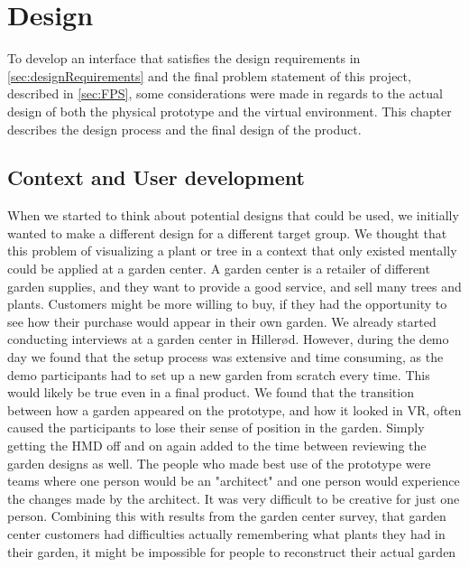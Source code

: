 \chapter{Design}
\label{chp:design}
To develop an interface that satisfies the design requirements in \autoref{sec:designRequirements} and the final problem statement of this project, described in \autoref{sec:FPS}, some considerations were made in regards to the actual design of both the physical prototype and the virtual environment. This chapter describes the design process and the final design of the product.

\section{Context and User development}
When we started to think about potential designs that could be used, we initially wanted to make a different design for a different target group. We thought that this problem of visualizing a plant or tree in a context that only existed mentally could be applied at a garden center. A garden center is a retailer of different garden supplies, and they want to provide a good service, and sell many trees and plants. Customers might be more willing to buy, if they had the opportunity to see how their purchase would appear in their own garden. We already started conducting interviews at a garden center in Hillerød. However, during the demo day we found that the setup process was extensive and time consuming, as the demo participants had to set up a new garden from scratch every time. This would likely be true even in a final product. We found that the transition between how a garden appeared on the prototype, and how it looked in VR, often caused the participants to lose their sense of position in the garden. Simply getting the HMD off and on again added to the time between reviewing the garden designs as well. The people who made best use of the prototype were teams where one person would be an "architect" and one person would experience the changes made by the architect. It was very difficult to be creative for just one person. Combining this with results from the garden center survey, that garden center customers had difficulties actually remembering what plants they had in their garden, it might be impossible for people to reconstruct their actual garden\\

